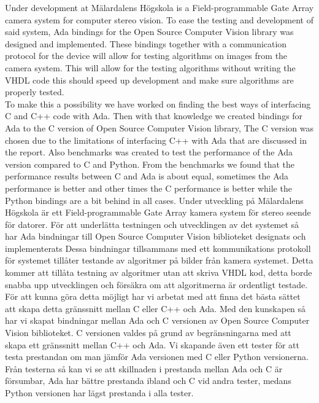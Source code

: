 \abstract
Under development at Mälardalens Högskola is a Field-programmable Gate Array camera system for computer stereo vision. To ease the testing and development of said system, Ada bindings for the Open Source Computer Vision library was designed and implemented. These bindings together with a communication protocol for the device will allow for testing algorithms on images from the camera system. This will allow for the testing algorithms without writing the VHDL code this should speed up development and make sure algorithms are properly tested.
\\
To make this a possibility we have worked on finding the best ways of interfacing C and C++ code with Ada. Then with that knowledge we created bindings for Ada to the C version of Open Source Computer Vision library, The C version was chosen due to the limitations of interfacing C++ with Ada that are discussed in the report. Also benchmarks was created to test the performance of the Ada version compared to C and Python. From the benchmarks we found that the performance results between C and Ada is about equal, sometimes the Ada performance is better and other times the C performance is better while the Python bindings are a bit behind in all cases. 
\abstract
Under utveckling på Mälardalens Högskola är ett Field-programmable Gate Array kamera system för stereo seende för datorer. För att underlätta testningen och utvecklingen av det systemet så har Ada bindningar till Open Source Computer Vision biblioteket designats och implementerats Dessa bindningar tillsammans med ett kommunikations protokoll för systemet tillåter testande av algoritmer på bilder från kamera systemet. Detta kommer att tillåta testning av algoritmer utan att skriva VHDL kod, detta borde snabba upp utvecklingen och försäkra om att algoritmerna är ordentligt testade.
\\
För att kunna göra detta möjligt har vi arbetat med att finna det bästa sättet att skapa detta gränssnitt mellan C eller C++ och Ada. Med den kunskapen så har vi skapat bindningar mellan Ada och C versionen av Open Source Computer Vision biblioteket. C versionen valdes på grund av  begränsningarna med att skapa ett gränssnitt mellan C++ och Ada. Vi skapande även ett tester för att testa prestandan om man jämför Ada versionen med C eller Python versionerna. Från testerna så kan vi se att skillnaden i prestanda mellan Ada och C är försumbar, Ada har bättre prestanda ibland och C vid andra tester, medans Python versionen har lägst prestanda i alla tester.